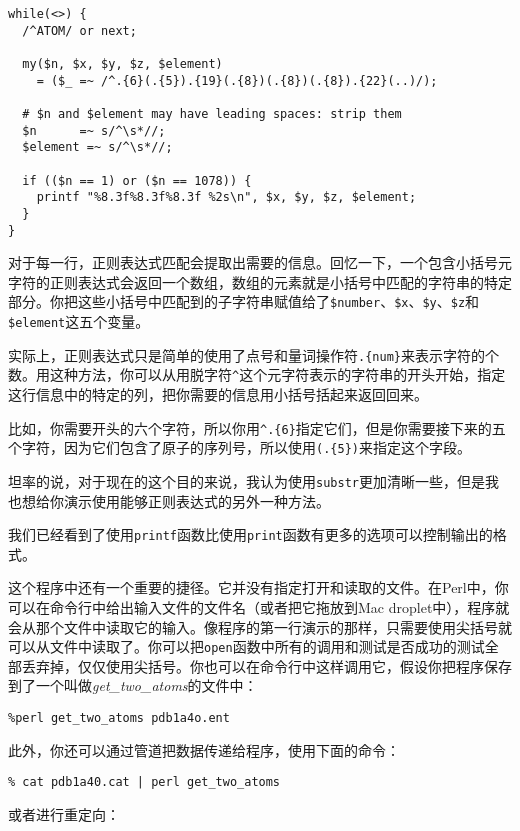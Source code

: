 \begin{lstlisting}
while(<>) {
  /^ATOM/ or next;

  my($n, $x, $y, $z, $element)
    = ($_ =~ /^.{6}(.{5}).{19}(.{8})(.{8})(.{8}).{22}(..)/);

  # $n and $element may have leading spaces: strip them
  $n      =~ s/^\s*//;
  $element =~ s/^\s*//;

  if (($n == 1) or ($n == 1078)) {
    printf "%8.3f%8.3f%8.3f %2s\n", $x, $y, $z, $element;
  }
}
\end{lstlisting}

对于每一行，正则表达式匹配会提取出需要的信息。回忆一下，一个包含小括号元字符的正则表达式会返回一个数组，数组的元素就是小括号中匹配的字符串的特定部分。你把这些小括号中匹配到的子字符串赋值给了\verb|$number|、\verb|$x|、\verb|$y|、\verb|$z|和\verb|$element|这五个变量。

实际上，正则表达式只是简单的使用了点号和量词操作符\verb|.{num}|来表示字符的个数。用这种方法，你可以从用脱字符\verb|^|这个元字符表示的字符串的开头开始，指定这行信息中的特定的列，把你需要的信息用小括号括起来返回回来。

比如，你需要开头的六个字符，所以你用\verb|^.{6}|指定它们，但是你需要接下来的五个字符，因为它们包含了原子的序列号，所以使用\verb|(.{5})|来指定这个字段。

坦率的说，对于现在的这个目的来说，我认为使用\verb|substr|更加清晰一些，但是我也想给你演示使用能够正则表达式的另外一种方法。

我们已经看到了使用\verb|printf|函数比使用\verb|print|函数有更多的选项可以控制输出的格式。

这个程序中还有一个重要的捷径。它并没有指定打开和读取的文件。在Perl中，你可以在命令行中给出输入文件的文件名（或者把它拖放到Mac
droplet中），程序就会从那个文件中读取它的输入。像程序的第一行演示的那样，只需要使用尖括号就可以从文件中读取了。你可以把\verb|open|函数中所有的调用和测试是否成功的测试全部丢弃掉，仅仅使用尖括号。你也可以在命令行中这样调用它，假设你把程序保存到了一个叫做\textit{get\_two\_atoms}的文件中：

\begin{lstlisting}
%perl get_two_atoms pdb1a4o.ent
\end{lstlisting}

此外，你还可以通过管道把数据传递给程序，使用下面的命令：

\begin{lstlisting}
% cat pdb1a40.cat | perl get_two_atoms
\end{lstlisting}

或者进行重定向：

